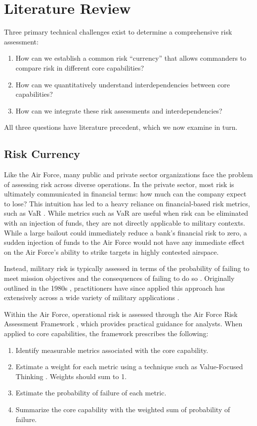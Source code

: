 \documentclass{article}
\begin{document}
\section{Literature Review}
Three primary technical challenges exist to determine a comprehensive risk assessment:
\begin{enumerate}
\item How can we establish a common risk ``currency'' that allows commanders to compare risk in different core capabilities?
\item How can we quantitatively understand interdependencies between core capabilities?
\item How can we integrate these risk assessments and interdependencies?
\end{enumerate}
All three questions have literature precedent, which we now examine in turn.

\subsection{Risk Currency}
Like the Air Force, many public and private sector organizations face the problem of assessing risk across diverse operations. In the private sector, most risk is ultimately communicated in financial terms: how much can the company expect to lose? This intuition has led to a heavy reliance on financial-based risk metrics, such as \ac{VaR} \citep{jorion2000value, linsmeier2000value}. While metrics such as \ac{VaR} are useful when risk can be eliminated with an injection of funds, they are not directly applicable to military contexts. While a large bailout could immediately reduce a bank's financial risk to zero, a sudden injection of funds to the Air Force would not have any immediate effect on the Air Force's ability to strike targets in highly contested airspace.

Instead, military risk is typically assessed in terms of the probability of failing to meet mission objectives and the consequences of failing to do so \citep{joint-risk-manual}. Originally outlined in the 1980s \citep{kaplan}, practitioners have since applied this approach has extensively across a wide variety of military applications \citep{lincoln, monach, hamill,buckshaw,caswell2011analysis,kucik}.

Within the Air Force, operational risk is assessed through the Air Force Risk Assessment Framework \citep{gallagher2016improving}, which provides practical guidance for analysts. When applied to core capabilities, the framework prescribes the following:
\begin{enumerate}
\item Identify measurable metrics associated with the core capability.
\item Estimate a weight for each metric using a technique such as Value-Focused Thinking \citep{keeney2009value}. Weights should sum to 1. 
\item Estimate the probability of failure of each metric.
\item Summarize the core capability with the weighted sum of probability of failure.
\end{enumerate}
\end{document}
